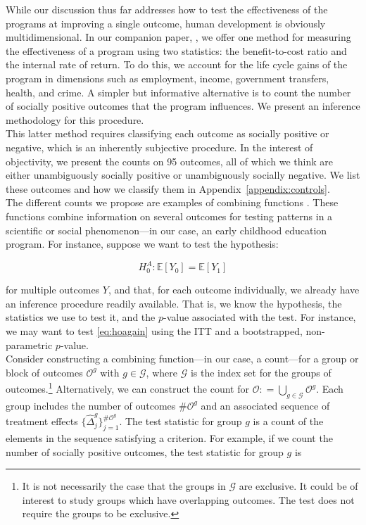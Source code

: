 \noindent While our discussion thus far addresses how to test the effectiveness of the programs at improving a single outcome, human development is obviously multidimensional. In our companion paper, \citet{Garcia_et_al_2016_ABC_unpublished}, we offer one method for measuring the effectiveness of a program using two statistics: the benefit-to-cost ratio and the internal rate of return. To do this, we account for the life cycle gains of the program in dimensions such as employment, income, government transfers, health, and crime. A simpler but informative alternative is to count the number of socially positive outcomes that the program influences. We present an inference methodology for this procedure.\\

\noindent This latter method requires classifying each outcome as socially positive or negative, which is an inherently subjective procedure. In the interest of objectivity, we present the counts on 95 outcomes, all of which we think are either unambiguously socially positive or unambiguously socially negative. We list these outcomes and how we classify them in Appendix~\ref{appendix:controls}.\\

\noindent The different counts we propose are examples of combining functions \citep[see][]{Pesarin_Salmaso_2010_PermutationTests}. These functions combine information on several outcomes for testing patterns in a scientific or social phenomenon---in our case, an early childhood education program. For instance, suppose we want to test the hypothesis: 

\begin{equation}
H_{0}^A: \mathbb{E} \left[ Y_{0} \right] =  \mathbb{E} \left[ Y_{1} \right] \label{eq:hoagain}
\end{equation}

\noindent for multiple outcomes $Y$, and that, for each outcome individually, we already have an inference procedure readily available. That is, we know the hypothesis, the statistics we use to test it, and the $p$-value associated with the test. For instance, we may want to test \eqref{eq:hoagain} using the ITT and a bootstrapped, non-parametric $p$-value.\\

\noindent Consider constructing a combining function---in our case, a count---for a group or block of outcomes $\mathcal{O}^g$ with $g \in \mathcal{G}$, where $\mathcal{G}$ is the index set for the groups of outcomes.\footnote{It is not necessarily the case that the groups in $\mathcal{G}$ are exclusive. It could be of interest to study groups which have overlapping outcomes. The test does not require the groups to be exclusive.} Alternatively, we can construct the count for $\mathcal{O} : =  \bigcup \limits _{g \in \mathcal{G}} \mathcal{O}^g$. Each group includes the number of outcomes $\# \mathcal{O}^g$ and an associated sequence of treatment effects $\{ \widehat{\Delta}_{j}^{g} \}_{j = 1}^{\# \mathcal{O}^g}$. The test statistic for group $g$ is a count of the elements in the sequence satisfying a criterion. For example, if we count the number of socially positive outcomes, the test statistic for group $g$ is 

